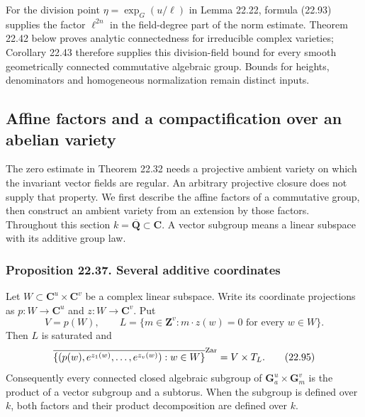 \documentclass[
  11pt,
  a4paper,
]{article}
\begin{document}
For the division point \(\eta=\exp_G(u/\ell)\) in Lemma 22.22, formula
(22.93) supplies the factor \(\ell^{2n}\) in the field-degree part of
the norm estimate. Theorem 22.42 below proves analytic connectedness for
irreducible complex varieties; Corollary 22.43 therefore supplies this
division-field bound for every smooth geometrically connected
commutative algebraic group. Bounds for heights, denominators and
homogeneous normalization remain distinct inputs.

\subsection{Affine factors and a compactification over an abelian
variety}\label{affine-factors-and-a-compactification-over-an-abelian-variety}

The zero estimate in Theorem 22.32 needs a projective ambient variety on
which the invariant vector fields are regular. An arbitrary projective
closure does not supply that property. We first describe the affine
factors of a commutative group, then construct an ambient variety from
an extension by those factors. Throughout this section
\(k=\overline{\mathbf Q}\subset\mathbf C\). A vector subgroup means a
linear subspace with its additive group law.

\subsubsection{Proposition 22.37. Several additive
coordinates}\label{proposition-22.37.-several-additive-coordinates}

Let \(W\subset\mathbf C^u\times\mathbf C^v\) be a complex linear
subspace. Write its coordinate projections as \(p:W\to\mathbf C^u\) and
\(z:W\to\mathbf C^v\). Put \[
 V=p(W),\qquad
 L=\{m\in\mathbf Z^v:m\cdot z(w)=0\text{ for every }w\in W\}.
 \tag{22.94}
\] Then \(L\) is saturated and \[
 \overline{\{(p(w),e^{z_1(w)},\ldots,e^{z_v(w)}):w\in W\}}^{\rm Zar}
       =V\times T_L.
 \tag{22.95}
\] Consequently every connected closed algebraic subgroup of
\(\mathbf G_a^u\times\mathbf G_m^v\) is the product of a vector subgroup
and a subtorus. When the subgroup is defined over \(k\), both factors
and their product decomposition are defined over \(k\).
\end{document}
